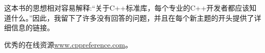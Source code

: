 这本书的思想相对容易解释:“关于C++标准库，每个专业的C++开发者都应该知道什么。”因此，我留下了许多没有回答的问题，并且在每个新主题的开头提供了详细信息的链接。

优秀的在线资源\href{http://en.cppreference.com/w/}{www.cppreference.com}。